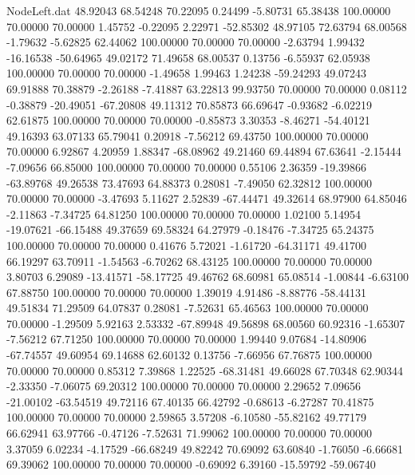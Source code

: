 \begin{filecontents}{NodeLeft.dat}
  48.92043   68.54248   70.22095     0.24499   -5.80731   65.38438  100.00000   70.00000   70.00000    1.45752   -0.22095    2.22971  -52.85302
  48.97105   72.63794   68.00568    -1.79632   -5.62825   62.44062  100.00000   70.00000   70.00000   -2.63794    1.99432  -16.16538  -50.64965
  49.02172   71.49658   68.00537     0.13756   -6.55937   62.05938  100.00000   70.00000   70.00000   -1.49658    1.99463    1.24238  -59.24293
  49.07243   69.91888   70.38879    -2.26188   -7.41887   63.22813   99.93750   70.00000   70.00000    0.08112   -0.38879  -20.49051  -67.20808
  49.11312   70.85873   66.69647    -0.93682   -6.02219   62.61875  100.00000   70.00000   70.00000   -0.85873    3.30353   -8.46271  -54.40121
  49.16393   63.07133   65.79041     0.20918   -7.56212   69.43750  100.00000   70.00000   70.00000    6.92867    4.20959    1.88347  -68.08962
  49.21460   69.44894   67.63641    -2.15444   -7.09656   66.85000  100.00000   70.00000   70.00000    0.55106    2.36359  -19.39866  -63.89768
  49.26538   73.47693   64.88373     0.28081   -7.49050   62.32812  100.00000   70.00000   70.00000   -3.47693    5.11627    2.52839  -67.44471
  49.32614   68.97900   64.85046    -2.11863   -7.34725   64.81250  100.00000   70.00000   70.00000    1.02100    5.14954  -19.07621  -66.15488
  49.37659   69.58324   64.27979    -0.18476   -7.34725   65.24375  100.00000   70.00000   70.00000    0.41676    5.72021   -1.61720  -64.31171
  49.41700   66.19297   63.70911    -1.54563   -6.70262   68.43125  100.00000   70.00000   70.00000    3.80703    6.29089  -13.41571  -58.17725
  49.46762   68.60981   65.08514    -1.00844   -6.63100   67.88750  100.00000   70.00000   70.00000    1.39019    4.91486   -8.88776  -58.44131
  49.51834   71.29509   64.07837     0.28081   -7.52631   65.46563  100.00000   70.00000   70.00000   -1.29509    5.92163    2.53332  -67.89948
  49.56898   68.00560   60.92316    -1.65307   -7.56212   67.71250  100.00000   70.00000   70.00000    1.99440    9.07684  -14.80906  -67.74557
  49.60954   69.14688   62.60132     0.13756   -7.66956   67.76875  100.00000   70.00000   70.00000    0.85312    7.39868    1.22525  -68.31481
  49.66028   67.70348   62.90344    -2.33350   -7.06075   69.20312  100.00000   70.00000   70.00000    2.29652    7.09656  -21.00102  -63.54519
  49.72116   67.40135   66.42792    -0.68613   -6.27287   70.41875  100.00000   70.00000   70.00000    2.59865    3.57208   -6.10580  -55.82162
  49.77179   66.62941   63.97766    -0.47126   -7.52631   71.99062  100.00000   70.00000   70.00000    3.37059    6.02234   -4.17529  -66.68249
  49.82242   70.69092   63.60840    -1.76050   -6.66681   69.39062  100.00000   70.00000   70.00000   -0.69092    6.39160  -15.59792  -59.06740

\end{filecontents}
